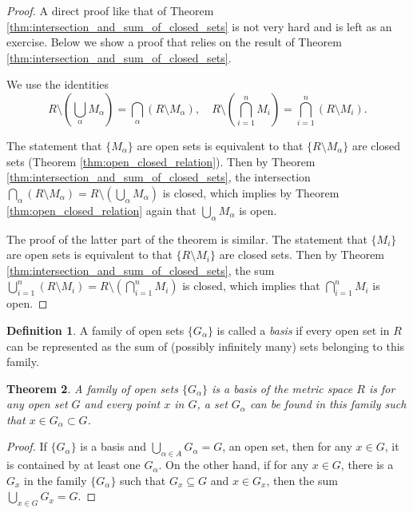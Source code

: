 \documentclass[a4paper,12pt]{article}
\newtheorem{thm}{Theorem}[section]
\theoremstyle{definition}
\newtheorem{defn}[thm]{Definition}
\theoremstyle{remark}
\begin{document}
\begin{proof}
  A direct proof like that of Theorem \ref{thm:intersection_and_sum_of_closed_sets} is not very hard and is left as an exercise. Below we show a proof that relies on the result of Theorem \ref{thm:intersection_and_sum_of_closed_sets}.

  We use the identities
  \begin{equation*}
    R \setminus \left( \bigcup_{\alpha} M_{\alpha} \right) = \bigcap_{\alpha} (R \setminus M_{\alpha}), \quad R \setminus \left( \bigcap^n_{i=1} M_i \right) = \bigcap^n_{i=1} (R \setminus M_i).
  \end{equation*}
  
  The statement that $\{ M_{\alpha} \}$ are open sets is equivalent to that $\{ R \setminus M_{\alpha} \}$ are closed sets (Theorem \ref{thm:open_closed_relation}). Then by Theorem \ref{thm:intersection_and_sum_of_closed_sets}, the intersection $\bigcap_{\alpha} (R \setminus M_{\alpha}) = R \setminus \left( \bigcup_{\alpha} M_{\alpha} \right)$ is closed, which implies by Theorem \ref{thm:open_closed_relation} again that $\bigcup_{\alpha} M_{\alpha}$ is open.

  The proof of the latter part of the theorem is similar. The statement that $\{ M_i \}$ are open sets is equivalent to that $\{ R \setminus M_i \}$ are closed sets. Then by Theorem \ref{thm:intersection_and_sum_of_closed_sets}, the sum $\bigcup^n_{i=1} (R \setminus M_i) = R \setminus \left( \bigcap^n_{i=1} M_i \right)$ is closed, which implies that $\bigcap^n_{i=1} M_i$ is open.
\end{proof}

\begin{defn}
  A family of open sets $\{ G_{\alpha} \}$ is called a \emph{basis} if every open set in $R$ can be represented as the sum of (possibly infinitely many) sets belonging to this family.
\end{defn}

\begin{thm} \label{thm:criteron_of_basis}
  A family of open sets $\{ G_{\alpha} \}$ is a basis of the metric space $R$ is for any open set $G$ and every point $x$ in $G$, a set $G_{\alpha}$ can be found in this family such that $x \in G_{\alpha} \subset G$.
\end{thm}

\begin{proof}
  If $\{ G_{\alpha} \}$ is a basis and $\bigcup_{\alpha \in A} G_{\alpha} = G$, an open set, then for any $x \in G$, it is contained by at least one $G_{\alpha}$. On the other hand, if for any $x \in G$, there is a $G_x$ in the family $\{ G_{\alpha} \}$ such that $G_x \subseteq G$ and $x \in G_x$, then the sum $\bigcup_{x \in G} G_x = G$.
\end{proof}
\end{document}

